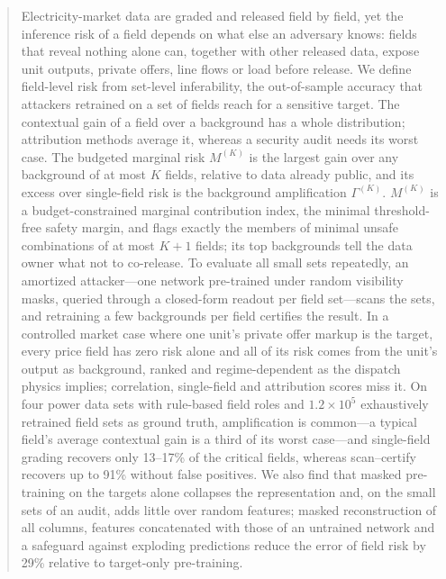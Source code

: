 \begin{abstract}
Electricity-market data are graded and released field by field, yet the inference risk of a field
depends on what else an adversary knows: fields that reveal nothing alone can, together with other
released data, expose unit outputs, private offers, line flows or load before release. We define
field-level risk from set-level inferability, the out-of-sample accuracy that attackers retrained on
a set of fields reach for a sensitive target. The contextual gain of a field over a background has a
whole distribution; attribution methods average it, whereas a security audit needs its worst case.
The budgeted marginal risk $M^{(K)}$ is the largest gain over any background of at most $K$ fields,
relative to data already public, and its excess over single-field risk is the background
amplification $\Gamma^{(K)}$. $M^{(K)}$ is a budget-constrained marginal contribution index, the
minimal threshold-free safety margin, and flags exactly the members of minimal unsafe combinations of
at most $K+1$ fields; its top backgrounds tell the data owner what not to co-release. To evaluate all
small sets repeatedly, an amortized attacker---one network pre-trained under random visibility masks,
queried through a closed-form readout per field set---scans the sets, and retraining a few backgrounds
per field certifies the result. In a controlled market case where one unit's private offer markup is
the target, every price field has zero risk alone and all of its risk comes from the unit's output as
background, ranked and regime-dependent as the dispatch physics implies; correlation, single-field and
attribution scores miss it. On four power data sets with rule-based field roles and
$1.2\times10^5$ exhaustively retrained field sets as ground truth, amplification is common---a typical
field's average contextual gain is a third of its worst case---and single-field grading recovers only
13--17\% of the critical fields, whereas scan--certify recovers up to 91\% without false positives.
We also find that masked pre-training on the targets alone collapses the representation and, on the
small sets of an audit, adds little over random features; masked reconstruction of all columns, features concatenated with
those of an untrained network and a safeguard against exploding predictions reduce the error of field risk by 29\% relative to target-only pre-training.
\end{abstract}
